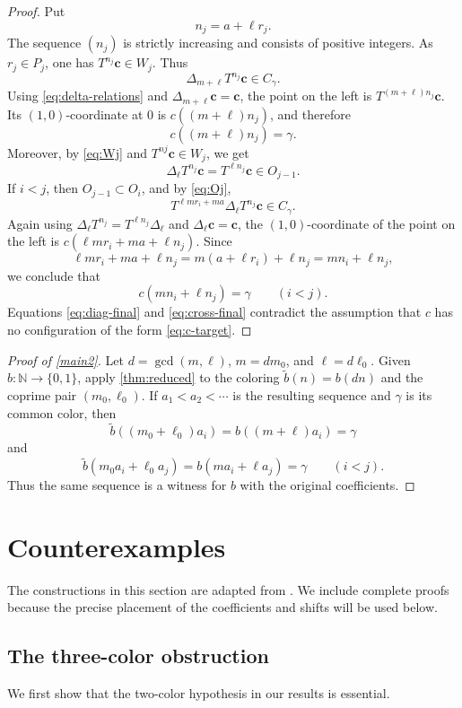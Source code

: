 \documentclass[reqno,12pt]{amsart}
\def \N {\mathbb N}
\numberwithin{equation}{section}
\begin{document}
\begin{proof}
Put
\[
 n_j=a+\ell r_j.
\]
The sequence $(n_j)$ is strictly increasing and consists of positive
integers. As $r_j\in P_j$, one has $T^{n_j}\mathbf c\in W_j$. Thus
\[
 \Delta_{m+\ell}T^{n_j}\mathbf c\in C_\gamma.
\]
Using \eqref{eq:delta-relations} and
$\Delta_{m+\ell}\mathbf c=\mathbf c$, the point on the left is
$T^{(m+\ell)n_j}\mathbf c$.  Its $(1,0)$-coordinate at $0$ is
$c((m+\ell)n_j)$, and therefore
\begin{equation}\label{eq:diag-final}
 c((m+\ell)n_j)=\gamma.
\end{equation}
Moreover, by \eqref{eq:Wj} and $T^{nj}\mathbf c\in W_j$, we get
\[
 \Delta_\ell T^{n_j}\mathbf c
 =T^{\ell n_j}\mathbf c\in O_{j-1}.
\]
If $i<j$, then $O_{j-1}\subset O_i$, and by \eqref{eq:Oj},
\[
 T^{\ell mr_i+ma}\Delta_\ell T^{n_j}\mathbf c\in C_\gamma.
\]
Again using $\Delta_\ell T^{n_j}=T^{\ell n_j}\Delta_\ell$ and
$\Delta_\ell\mathbf c=\mathbf c$, the $(1,0)$-coordinate of the point
on the left is $c(\ell mr_i+ma+\ell n_j)$.  Since
\[
 \ell mr_i+ma+\ell n_j
 =m(a+\ell r_i)+\ell n_j
 =mn_i+\ell n_j,
\]
we conclude that
\begin{equation}\label{eq:cross-final}
 c(mn_i+\ell n_j)=\gamma
 \qquad(i<j).
\end{equation}
Equations \eqref{eq:diag-final} and \eqref{eq:cross-final} contradict the
assumption that $c$ has no configuration of the form \eqref{eq:c-target}.
\end{proof}

\begin{proof}[Proof of \cref{main2}]
Let $d=\gcd(m,\ell)$, $m=dm_0$, and $\ell=d\ell_0$. Given
$b:\N\to\{0,1\}$, apply \cref{thm:reduced} to the coloring
$\widetilde b(n)=b(dn)$ and the coprime pair $(m_0,\ell_0)$. If
$a_1<a_2<\cdots$ is the resulting sequence and $\gamma$ is its common
color, then
\[
 \widetilde b((m_0+\ell_0)a_i)=b((m+\ell)a_i)=\gamma
\]
and
\[
 \widetilde b(m_0a_i+\ell_0a_j)=b(ma_i+\ell a_j)=\gamma
 \qquad(i<j).
\]
Thus the same sequence is a witness for $b$ with the original coefficients.
\end{proof}


\section{Counterexamples}\label{sec6}
The constructions in this section are adapted from \cite{Neil79,LianXiao24}.
We include complete proofs because the precise placement of the coefficients
and shifts will be used below.
\subsection{The three-color obstruction}
We first show that the two-color hypothesis in our results is essential.
\end{document}
